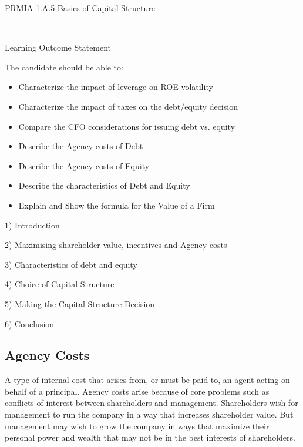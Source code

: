 
PRMIA 1.A.5 Basics of Capital Structure 



--------------------------------------------------------------------------------


Learning Outcome Statement


The candidate should be able to:
\begin{itemize}	
\item	  Characterize the impact of leverage on ROE volatility
\item	  Characterize the impact of taxes on the debt/equity decision
\item	  Compare the CFO considerations for issuing debt vs. equity
\item	  Describe the Agency costs of Debt
\item	  Describe the Agency costs of Equity
\item	  Describe the characteristics of Debt and Equity
\item	  Explain and Show the formula for the Value of a Firm
\end{itemize}	
1) Introduction

2) Maximising shareholder value, incentives and Agency costs

3) Characteristics of debt and equity

4) Choice of Capital Structure

5) Making the Capital Structure Decision

6) Conclusion



\subsection*{Agency Costs}

A type of internal cost that arises from, or must be paid to, an agent acting on behalf of a principal. Agency costs arise because of core problems such as conflicts of interest between shareholders and management. Shareholders wish for management to run the company in a way that increases shareholder value. But management may wish to grow the company in ways that maximize their personal power and wealth that may not be in the best interests of shareholders.





